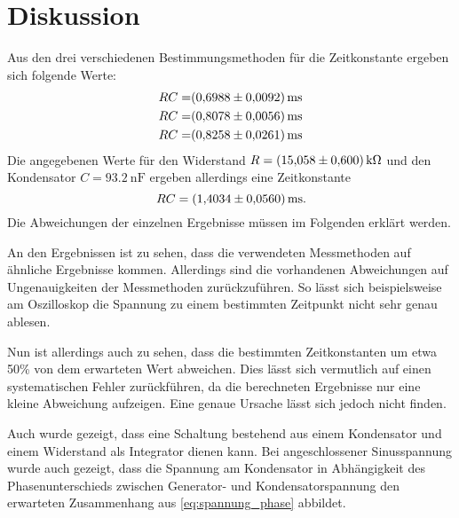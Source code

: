 \section{Diskussion}
\label{sec:Diskussion}


Aus den drei verschiedenen Bestimmungsmethoden für die Zeitkonstante ergeben sich folgende Werte:
\begin{align}
    RC =& \SI{0.6988+-0.0092}{\milli\second} \\
    RC =& \SI{0.8078+-0.0056}{\milli\second} \\
    RC =& \SI{0.8258+-0.0261}{\milli\second}
\end{align}
Die angegebenen Werte für den Widerstand $R=\SI{15.058+-0.6}{\kilo\ohm}$ und den Kondensator $C=\SI{93.2}{\nano\farad}$ ergeben allerdings eine Zeitkonstante
\begin{equation}
    RC = \SI{1.4034+-0.056}{\milli\second}.
\end{equation}
Die Abweichungen der einzelnen Ergebnisse müssen im Folgenden erklärt werden.

An den Ergebnissen ist zu sehen, dass die verwendeten Messmethoden auf ähnliche Ergebnisse kommen.
Allerdings sind die vorhandenen Abweichungen auf Ungenauigkeiten der Messmethoden zurückzuführen. So lässt sich beispielsweise am Oszilloskop die Spannung zu einem bestimmten Zeitpunkt nicht sehr genau ablesen. 

Nun ist allerdings auch zu sehen, dass die bestimmten Zeitkonstanten um etwa 50\% von dem erwarteten Wert abweichen. Dies lässt sich vermutlich auf einen systematischen Fehler zurückführen, da die berechneten Ergebnisse nur eine kleine Abweichung aufzeigen. Eine genaue Ursache lässt sich jedoch nicht finden.

Auch wurde gezeigt, dass eine Schaltung bestehend aus einem Kondensator und einem Widerstand als Integrator dienen kann. Bei angeschlossener Sinusspannung wurde auch gezeigt, dass die Spannung am Kondensator in Abhängigkeit des Phasenunterschieds zwischen Generator- und Kondensatorspannung den erwarteten Zusammenhang aus \autoref{eq:spannung_phase} abbildet.
